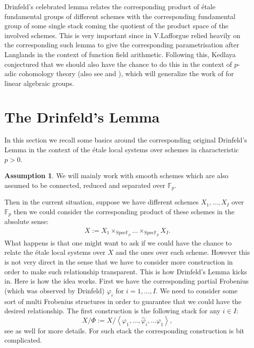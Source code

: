 \documentclass[11pt]{book}
\theoremstyle{definition}
\numberwithin{equation}{section}
\newtheorem{assumption}[theorem]{Assumption}
\begin{document}
Drinfeld's celebrated lemma relates the corresponding product of \'etale fundamental groups of different schemes with the corresponding fundamental group of some single stack coming the quotient of the product space of the involved schemes. This is very important since in \cite{La1} V.Lafforgue relied heavily on the corresponding such lemma to give the corresponding parametrisation after Langlands in the context of function field arithmetic. Following this, Kedlaya conjectured that we should also have the chance to do this in the context of $p$-adic cohomology theory (also see \cite{Ked9} and \cite{KX}), which will generalize the work of \cite{Abe} for linear algebraic groups. 







\section{The Drinfeld's Lemma}

\noindent In this section we recall some basics around the corresponding original Drinfeld's Lemma in the context of the \'etale local systems over schemes in characteristic $p>0$.


\begin{assumption}
We will mainly work with smooth schemes which are also assumed to be connected, reduced and separated over $\mathbb{F}_p$.
\end{assumption}


\indent Then in the current situation, suppose we have different schemes $X_1,...,X_I$ over $\mathbb{F}_p$ then we could consider the corresponding product of these schemes in the absolute sense:
\begin{align}
X:=X_1\times_{\mathrm{Spec}\mathbb{F}_p}...\times_{\mathrm{Spec}\mathbb{F}_p}X_I.	
\end{align}
What happens is that one might want to ask if we could have the chance to relate the \'etale local systems over $X$ and the ones over each scheme. However this is not very direct in the sense that we have to consider more construction in order to make such relationship transparent. This is how Drinfeld's Lemma kicks in. Here is how the idea works. First we have the corresponding partial Frobenius (which was observed by Drinfeld) $\varphi_i$ for $i=1,...,I$. We need to consider some sort of multi Frobenius structures in order to guarantee that we could have the desired relationship. The first construction is the following stack for any $i\in I$:
\begin{displaymath}
X/\Phi:=X/\left<\varphi_1,...,\widehat{\varphi}_i,...\varphi_1\right>,
\end{displaymath}
see \cite[Sheaves, Stacks and Shtukas, Definition 4.2.10]{perf} as well for more details. For such stack the corresponding construction is bit complicated.
\end{document}
